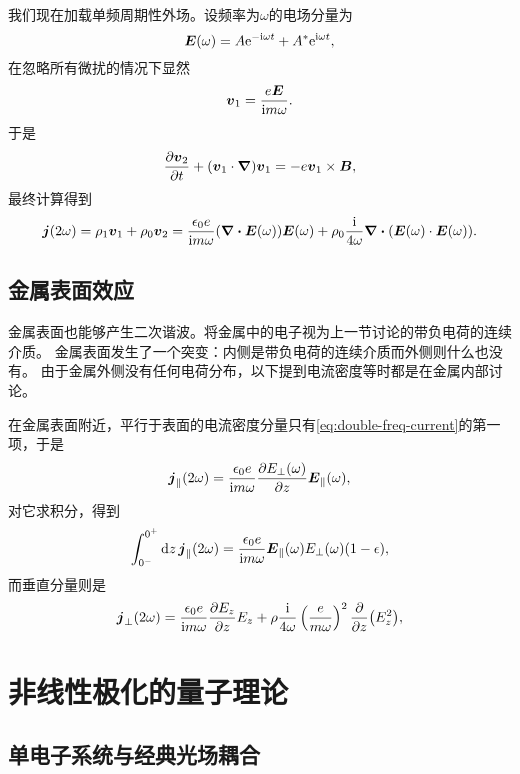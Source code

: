我们现在加载单频周期性外场。设频率为$\omega$的电场分量为
\begin{equation}
    \vb*{E}(\omega) = A \mathrm{e}^{- \mathrm{i} \omega t} + A^* \mathrm{e}^{\mathrm{i} \omega t},
\end{equation}
在忽略所有微扰的情况下显然
\begin{equation}
    \vb*{v}_1 = \frac{e \vb*{E}}{\mathrm{i} m \omega}.
\end{equation}
于是
\[
    \pdv{\vb*{v}_2}{t} + (\vb*{v}_1 \cdot \grad) \vb*{v}_1 = - e \vb*{v}_1 \times \vb*{B},
\]
最终计算得到
\begin{equation}
    \vb*{j}(2\omega) = \rho_1 \vb*{v}_1 + \rho_0 \vb*{v}_2 = \frac{\epsilon_0 e}{\mathrm{i} m \omega} (\div{\vb*{E}(\omega)}) \vb*{E}(\omega) + \rho_0 \frac{\mathrm{i}}{4\omega} \div(\vb*{E}(\omega) \cdot \vb*{E}(\omega)).
    \label{eq:double-freq-current}
\end{equation}

\subsection{金属表面效应}

金属表面也能够产生二次谐波。将金属中的电子视为上一节讨论的带负电荷的连续介质。
金属表面发生了一个突变：内侧是带负电荷的连续介质而外侧则什么也没有。
由于金属外侧没有任何电荷分布，以下提到电流密度等时都是在金属内部讨论。

在金属表面附近，平行于表面的电流密度分量只有\eqref{eq:double-freq-current}的第一项，于是
\begin{equation}
    \vb*{j}_\parallel(2\omega) = \frac{\epsilon_0 e}{\mathrm{i} m \omega} \pdv{E_\bot(\omega)}{z} \vb*{E}_\parallel(\omega) , 
\end{equation}
对它求积分，得到
\[
    \int_{0^-}^{0^+} \dd{z} \vb*{j}_\parallel(2\omega) = \frac{\epsilon_0 e}{\mathrm{i} m \omega} \vb*{E}_{\parallel} (\omega) E_\bot(\omega) (1 - \epsilon),
\]
而垂直分量则是
\begin{equation}
    \vb*{j}_\bot(2\omega) = \frac{\epsilon_0 e}{\mathrm{i} m \omega} \pdv{E_z}{z} E_z + \rho \frac{\mathrm{i}}{4\omega} \left(\frac{e}{m\omega}\right)^2 \pdv{z} (E_z^2),
\end{equation}

\section{非线性极化的量子理论}

\subsection{单电子系统与经典光场耦合}

